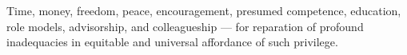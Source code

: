 Time, money, freedom, peace, encouragement, presumed competence, education, role models, advisorship, and colleagueship --- for reparation of profound inadequacies in equitable and universal affordance of such privilege.
